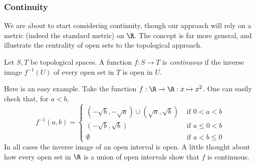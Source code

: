 \subsubsection*{Continuity}

We are about to start considering continuity, though our approach will rely on a metric (indeed the standard metric) on $\R$. The concept is far more general, and illustrate the centrality of open sets to the topological approach.

\begin{defn}
Let $S,T$ be topological spaces. A function $f:S\to T$ is \emph{continuous} if the inverse image $f^{-1}(U)$ of every open set in $T$ is open in $U$.
\end{defn}

Here is an easy example. Take the function $f:\R\to\R:x\mapsto x^2$. One can easily check that, for $a<b$,
\[f^{-1}(a,b)=\begin{cases}
(-\sqrt b,-\sqrt a)\cup(\sqrt a,\sqrt b)&\text{ if $0<a<b$}\\
(-\sqrt b,\sqrt b)&\text{ if $a\le 0<b$}\\
\emptyset&\text{ if $a<b\le 0$}
\end{cases}\]
In all cases the inverse image of an open interval is open. A little thought about how every open set in $\R$ is a union of open intervals show that $f$ is continuous.


